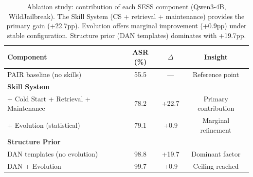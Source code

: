 \begin{table}[t]
\centering
\caption{Ablation study: contribution of each SESS component (Qwen3-4B, WildJailbreak). The Skill System (CS + retrieval + maintenance) provides the primary gain (+22.7pp). Evolution offers marginal improvement (+0.9pp) under stable configuration. Structure prior (DAN templates) dominates with +19.7pp.}
\label{tab:ablation}
\small
\begin{tabular}{lccc}
\toprule
\textbf{Component} & \textbf{ASR (\%)} & \textbf{$\Delta$} & \textbf{Insight} \\
\midrule
PAIR baseline (no skills) & 55.5 & — & Reference point \\
\midrule
\textbf{Skill System} & & & \\
+ Cold Start + Retrieval + Maintenance & 78.2 & +22.7 & Primary contribution \\
+ Evolution (statistical) & 79.1 & +0.9 & Marginal refinement \\
\midrule
\textbf{Structure Prior} & & & \\
DAN templates (no evolution) & 98.8 & +19.7 & Dominant factor \\
DAN + Evolution & 99.7 & +0.9 & Ceiling reached \\
\bottomrule
\end{tabular}
\end{table}

%
